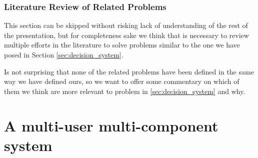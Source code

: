 \subsubsection{Literature Review of Related Problems}
\label{sec:lit_review_algorithms}
This section can be skipped without risking lack of understanding of the rest of the presentation, but for completeness sake we think that is necessary to review multiple efforts in the literature to solve problems similar to the one we have posed in Section \ref{sec:decision_system}. 

Is not surprising that none of the related problems have been defined in the same way we have defined ours, so we want to offer some commentary on which of them we think are more relevant to problem in \ref{sec:decision_system} and why.

\section{A multi-user multi-component system}